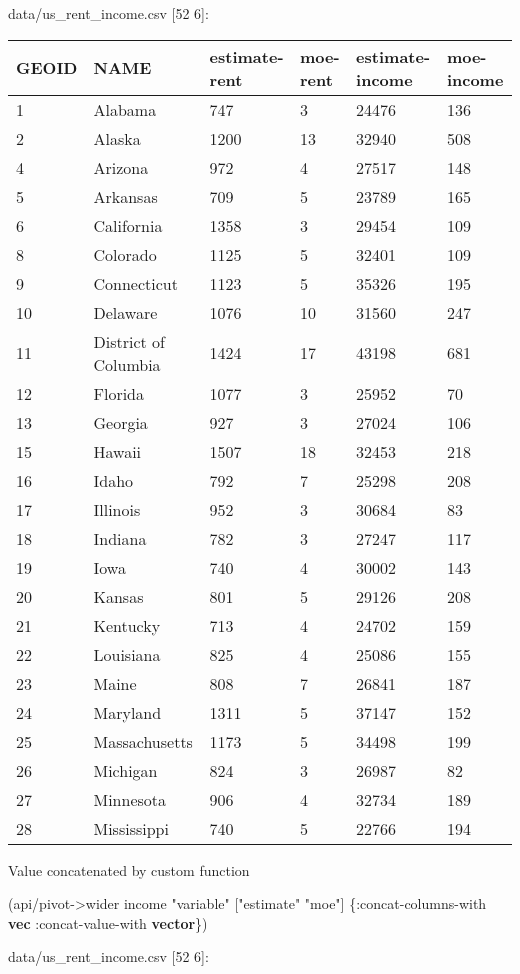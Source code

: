 \documentclass[]{article}
\newenvironment{Shaded}{\begin{snugshade}}{\end{snugshade}}
\newcommand{\KeywordTok}[1]{\textcolor[rgb]{0.13,0.29,0.53}{\textbf{#1}}}
\newcommand{\StringTok}[1]{\textcolor[rgb]{0.31,0.60,0.02}{#1}}
\newcommand{\AttributeTok}[1]{\textcolor[rgb]{0.77,0.63,0.00}{#1}}
\newcommand{\NormalTok}[1]{#1}
\begin{document}
data/us\_rent\_income.csv {[}52 6{]}:

\begin{longtable}[]{@{}llllll@{}}
\toprule
GEOID & NAME & estimate-rent & moe-rent & estimate-income &
moe-income\tabularnewline
\midrule
\endhead
1 & Alabama & 747 & 3 & 24476 & 136\tabularnewline
2 & Alaska & 1200 & 13 & 32940 & 508\tabularnewline
4 & Arizona & 972 & 4 & 27517 & 148\tabularnewline
5 & Arkansas & 709 & 5 & 23789 & 165\tabularnewline
6 & California & 1358 & 3 & 29454 & 109\tabularnewline
8 & Colorado & 1125 & 5 & 32401 & 109\tabularnewline
9 & Connecticut & 1123 & 5 & 35326 & 195\tabularnewline
10 & Delaware & 1076 & 10 & 31560 & 247\tabularnewline
11 & District of Columbia & 1424 & 17 & 43198 & 681\tabularnewline
12 & Florida & 1077 & 3 & 25952 & 70\tabularnewline
13 & Georgia & 927 & 3 & 27024 & 106\tabularnewline
15 & Hawaii & 1507 & 18 & 32453 & 218\tabularnewline
16 & Idaho & 792 & 7 & 25298 & 208\tabularnewline
17 & Illinois & 952 & 3 & 30684 & 83\tabularnewline
18 & Indiana & 782 & 3 & 27247 & 117\tabularnewline
19 & Iowa & 740 & 4 & 30002 & 143\tabularnewline
20 & Kansas & 801 & 5 & 29126 & 208\tabularnewline
21 & Kentucky & 713 & 4 & 24702 & 159\tabularnewline
22 & Louisiana & 825 & 4 & 25086 & 155\tabularnewline
23 & Maine & 808 & 7 & 26841 & 187\tabularnewline
24 & Maryland & 1311 & 5 & 37147 & 152\tabularnewline
25 & Massachusetts & 1173 & 5 & 34498 & 199\tabularnewline
26 & Michigan & 824 & 3 & 26987 & 82\tabularnewline
27 & Minnesota & 906 & 4 & 32734 & 189\tabularnewline
28 & Mississippi & 740 & 5 & 22766 & 194\tabularnewline
\bottomrule
\end{longtable}

Value concatenated by custom function

\begin{Shaded}
\begin{Highlighting}[]
\NormalTok{(api/pivot->wider income }\StringTok{"variable"}\NormalTok{ [}\StringTok{"estimate"} \StringTok{"moe"}\NormalTok{] \{}\AttributeTok{:concat-columns-with} \KeywordTok{vec}
                                                        \AttributeTok{:concat-value-with} \KeywordTok{vector}\NormalTok{\})}
\end{Highlighting}
\end{Shaded}

data/us\_rent\_income.csv {[}52 6{]}:
\end{document}
